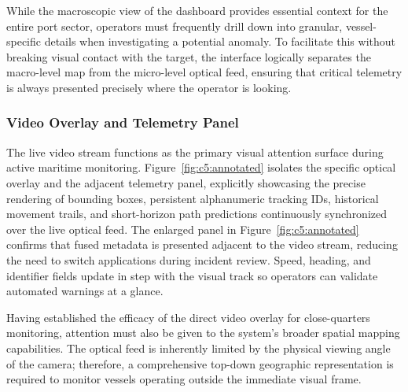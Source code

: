 While the macroscopic view of the dashboard provides essential context for the entire port sector, operators must frequently drill down into granular, vessel-specific details when investigating a potential anomaly. To facilitate this without breaking visual contact with the target, the interface logically separates the macro-level map from the micro-level optical feed, ensuring that critical telemetry is always presented precisely where the operator is looking.

\subsubsection{Video Overlay and Telemetry Panel}
\begin{reportfigblock}
The live video stream functions as the primary visual attention surface during active maritime monitoring. Figure~\ref{fig:c5:annotated} isolates the specific optical overlay and the adjacent telemetry panel, explicitly showcasing the precise rendering of bounding boxes, persistent alphanumeric tracking IDs, historical movement trails, and short-horizon path predictions continuously synchronized over the live optical feed.
The enlarged panel in Figure~\ref{fig:c5:annotated} confirms that fused metadata is presented adjacent to the video stream, reducing the need to switch applications during incident review. Speed, heading, and identifier fields update in step with the visual track so operators can validate automated warnings at a glance.
\end{reportfigblock}

Having established the efficacy of the direct video overlay for close-quarters monitoring, attention must also be given to the system's broader spatial mapping capabilities. The optical feed is inherently limited by the physical viewing angle of the camera; therefore, a comprehensive top-down geographic representation is required to monitor vessels operating outside the immediate visual frame.

